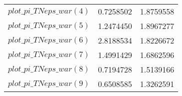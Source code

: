 \begin{center}
\begin{longtable}{lcc}
$plot\_pi\_TN eps\_war (4)   $	 & 	      0.7258502	 & 	      1.8759558 \\ 
$plot\_pi\_TN eps\_war (5)   $	 & 	      1.2474450	 & 	      1.8967277 \\ 
$plot\_pi\_TN eps\_war (6)   $	 & 	      2.8188534	 & 	      1.8226672 \\ 
$plot\_pi\_TN eps\_war (7)   $	 & 	      1.4991429	 & 	      1.6862596 \\ 
$plot\_pi\_TN eps\_war (8)   $	 & 	      0.7194728	 & 	      1.5139166 \\ 
$plot\_pi\_TN eps\_war (9)   $	 & 	      0.6508585	 & 	      1.3262591 \\ 
\end{longtable}
 \end{center}
